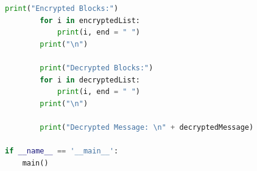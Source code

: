 \documentclass{article}
\begin{document}
\begin{lstlisting}[language=Python,breaklines=true,showspaces=false]
        print("Encrypted Blocks:")
        for i in encryptedList:
            print(i, end = " ")
        print("\n")

        print("Decrypted Blocks:")
        for i in decryptedList:
            print(i, end = " ")
        print("\n")

        print("Decrypted Message: \n" + decryptedMessage)

if __name__ == '__main__':
    main()

\end{lstlisting}

\newpage
\nocite{*}
{}

\end{document}

